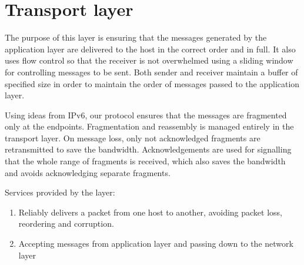 \documentclass[11pt,a4paper,oneside]{report}
\begin{document}
\section*{Transport layer}
The purpose of this layer is ensuring that the messages generated by the
application layer are delivered to the host in the correct order and in full.
It also uses flow control so that the receiver is not overwhelmed using a
sliding window for controlling messages to be sent. Both sender and receiver
maintain a buffer of specified size in order to maintain the order of messages
passed to the application layer.

Using ideas from IPv6, our protocol ensures that the messages are fragmented
only at the endpoints. Fragmentation and reassembly is managed entirely in the
transport layer. On message loss, only not acknowledged fragments are
retransmitted to save the bandwidth. Acknowledgements are used for signalling
that the whole range of fragments is received, which also saves the bandwidth
and avoids acknowledging separate fragments.

Services provided by the layer:
\begin{enumerate}
  \item Reliably delivers a packet from one host to another, avoiding
   packet loss, reordering and corruption.
   \item Accepting messages from application layer and passing down to the
   network layer
\end{enumerate}
\end{document}
